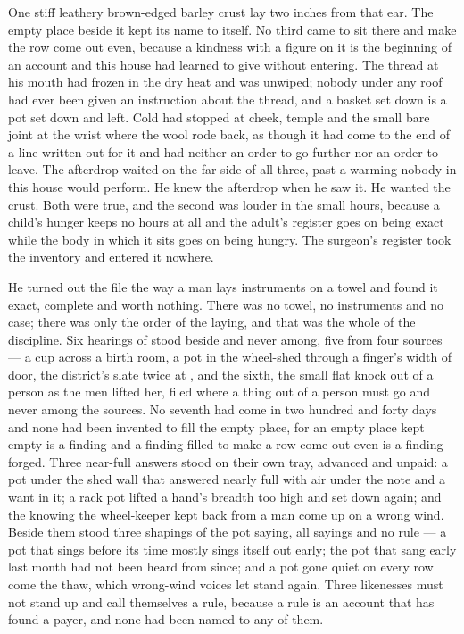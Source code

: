 One stiff leathery brown-edged barley crust lay two inches from that ear. The empty place beside it kept its name to itself. No third came to sit there and make the row come out even, because a kindness with a figure on it is the beginning of an account and this house had learned to give without entering. The thread at his mouth had frozen in the dry heat and was unwiped; nobody under any roof had ever been given an instruction about the thread, and a basket set down is a pot set down and left. Cold had stopped at cheek, temple and the small bare joint at the wrist where the wool rode back, as though it had come to the end of a line written out for it and had neither an order to go further nor an order to leave. The afterdrop waited on the far side of all three, past a warming nobody in this house would perform. He knew the afterdrop when he saw it. He wanted the crust. Both were true, and the second was louder in the small hours, because a child's hunger keeps no hours at all and the adult's register goes on being exact while the body in which it sits goes on being hungry. The surgeon's register took the inventory and entered it nowhere.

He turned out the file the way a man lays instruments on a towel and found it exact, complete and worth nothing. There was no towel, no instruments and no case; there was only the order of the laying, and that was the whole of the discipline. Six hearings of  stood beside and never among, five from four sources --- a cup across a birth room, a pot in the wheel-shed through a finger's width of door, the district's slate twice at , and the sixth, the small flat knock out of a person as the men lifted her, filed where a thing out of a person must go and never among the sources. No seventh had come in two hundred and forty days and none had been invented to fill the empty place, for an empty place kept empty is a finding and a finding filled to make a row come out even is a finding forged. Three near-full answers stood on their own tray, advanced and unpaid: a pot under the shed wall that answered nearly full with air under the note and a want in it; a rack pot lifted a hand's breadth too high and set down again; and the knowing the wheel-keeper kept back from a man come up on a wrong wind. Beside them stood three shapings of the pot saying, all sayings and no rule --- a pot that sings before its time mostly sings itself out early; the pot that sang early last month had not been heard from since; and a pot gone quiet on every row come the thaw, which wrong-wind voices let stand again. Three likenesses must not stand up and call themselves a rule, because a rule is an account that has found a payer, and none had been named to any of them.

